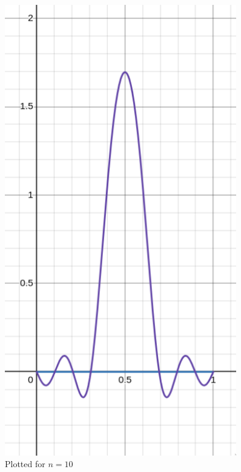 \documentclass[letter]{article}
\begin{document}
\begin{minipage}{0.3\textwidth}
\begin{figure}[H]
	\centering
	\includegraphics[width=0.9\textwidth]{ss/speed01.png}
	\caption{Plotted for $n = 10$}
	\label{fig:ss-speed01-png}
\end{figure}
\end{minipage}
\hfill
\end{document}
